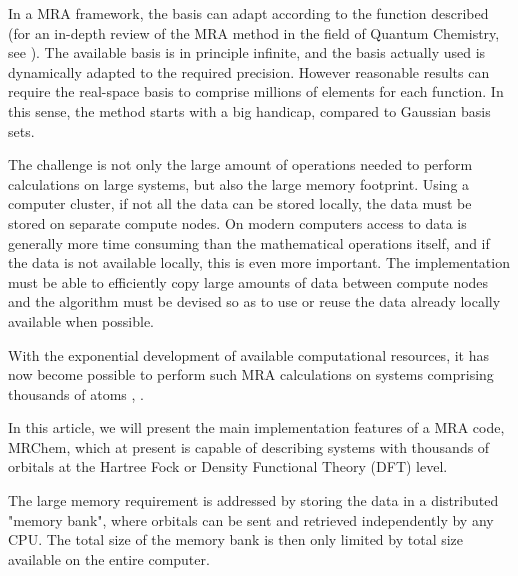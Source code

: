 \documentclass{article}
\begin{document}
In a MRA framework, the basis can adapt according to the function described (for an in-depth review of the MRA method in the field of Quantum Chemistry, see \citep[]{bischoff2019}). The available basis is in principle infinite, and the basis actually used is dynamically adapted to the required precision. However reasonable results can require the real-space basis to comprise millions of elements for each function. In this sense, the method starts with a big handicap, compared to Gaussian basis sets.

The challenge is not only the large amount of operations needed to perform calculations on large systems, but also the large memory footprint. Using a computer cluster, if not all the data can be stored locally, the data must be stored on separate compute nodes. On modern computers access to data is generally more time consuming than the mathematical operations itself, and if the data is not available locally, this is even more important. The implementation must be able to efficiently copy large amounts of data between compute nodes and the algorithm must be devised so as to use or reuse the data already locally available when possible.

With the exponential development of available computational resources, it has now become possible to perform such MRA calculations on systems comprising thousands of atoms \cite{ratcliff2020}, \cite{madness2016}. 


In this article, we will present the main implementation features of a MRA code, MRChem, which at present is capable of describing systems with thousands of orbitals at the Hartree Fock or Density Functional Theory (DFT) level.  

The large memory requirement is addressed by storing the data in a distributed "memory bank", where orbitals can be sent and retrieved independently by any CPU. The total size of the memory bank is then only limited by total size available on the entire computer.
\end{document}
